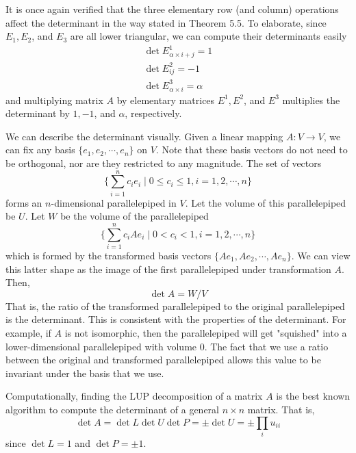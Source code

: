   It is once again verified that the three elementary row (and column) operations affect the determinant in the way stated in Theorem 5.5. To elaborate, since $E_1, E_2$, and $E_3$ are all lower triangular, we can compute their determinants easily
  \begin{align*}
    \det{E^1_{\alpha \times i + j}} = 1 \\
    \det{E^2_{i j}} = -1 \\
    \det{E^3_{\alpha \times i}} = \alpha
  \end{align*}
  and multiplying matrix $A$ by elementary matrices $E^1, E^2$, and $E^3$ multiplies the determinant by $1, -1$, and $\alpha$, respectively. 

  We can describe the determinant visually. Given a linear mapping $A: V \to V$, we can fix any basis $\{e_1, e_2, \cdots, e_n\}$ on $V$. Note that these basis vectors do not need to be orthogonal, nor are they restricted to any magnitude. The set of vectors 
  \begin{equation}
    \Big\{ \sum_{i=1}^n c_i e_i \mid 0 \leq c_i \leq 1, i = 1, 2, \cdots, n\Big\}
  \end{equation}
  forms an $n$-dimensional parallelepiped in $V$. Let the volume of this parallelepiped be $U$. Let $W$ be the volume of the parallelepiped 
  \begin{equation}
    \Big\{ \sum_{i=1}^n c_i A e_i \mid 0<c_i<1, i = 1, 2, \cdots, n\Big\}
  \end{equation}
  which is formed by the transformed basis vectors $\{Ae_1, Ae_2, \cdots, Ae_n\}$. We can view this latter shape as the image of the first parallelepiped under transformation $A$. Then, 
  \begin{equation}
    \det{A} = W / V 
  \end{equation}
  That is, the ratio of the transformed parallelepiped to the original parallelepiped is the determinant. This is consistent with the properties of the determinant. For example, if $A$ is not isomorphic, then the parallelepiped will get "squished" into a lower-dimensional parallelepiped with volume $0$. The fact that we use a ratio between the original and transformed parallelepiped allows this value to be invariant under the basis that we use. 

  Computationally, finding the LUP decomposition of a matrix $A$ is the best known algorithm to compute the determinant of a general $n \times n$ matrix. That is, 
  \begin{equation}
    \det{A} = \det{L} \det{U} \det{P} = \pm \det{U} = \pm \prod_i u_{i i}
  \end{equation}
  since $\det{L} = 1$ and $\det{P} = \pm 1$. 

